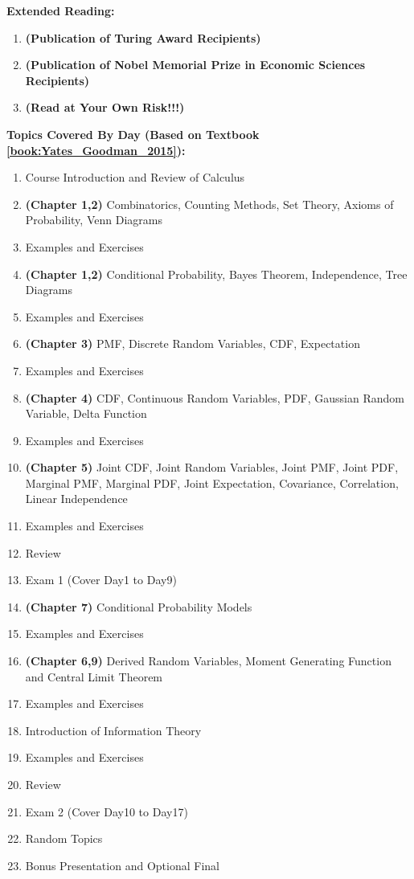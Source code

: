 \documentclass{article}
\begin{document}
\textbf{Extended Reading:}{
    \begin{enumerate}
            \item \textbf{(Publication of Turing Award Recipients)} 
            \item \textbf{(Publication of Nobel Memorial Prize in Economic Sciences Recipients)} 
            \item \textbf{(Read at Your Own Risk!!!)} 
    \end{enumerate}
}

\textbf{Topics Covered By Day (Based on Textbook \cref{book:Yates_Goodman_2015}):} {
    \begin{enumerate}
        \item Course Introduction and Review of Calculus
        \item \textbf{(Chapter 1,2)} Combinatorics, Counting Methods, Set Theory, Axioms of Probability, Venn Diagrams
        \item Examples and Exercises
        \item \textbf{(Chapter 1,2)} Conditional Probability, Bayes Theorem, Independence, Tree Diagrams
        \item Examples and Exercises
        \item \textbf{(Chapter 3)} PMF, Discrete Random Variables, CDF, Expectation
        \item Examples and Exercises
        \item \textbf{(Chapter 4)} CDF, Continuous Random Variables, PDF, Gaussian Random Variable, Delta Function
        \item Examples and Exercises
        \item \textbf{(Chapter 5)} Joint CDF, Joint Random Variables, Joint PMF, Joint PDF, Marginal PMF, Marginal PDF, Joint Expectation, Covariance, Correlation, Linear Independence
        \item Examples and Exercises
        \item Review
        \item Exam 1 (Cover Day1 to Day9)
        \item \textbf{(Chapter 7)} Conditional Probability Models
        \item Examples and Exercises
        \item \textbf{(Chapter 6,9)} Derived Random Variables, Moment Generating Function and Central Limit Theorem
        \item Examples and Exercises
        \item Introduction of Information Theory
        \item Examples and Exercises
        \item Review
        \item Exam 2 (Cover Day10 to Day17)
        \item Random Topics
        \item Bonus Presentation and Optional Final
    \end{enumerate}
}
\end{document}
